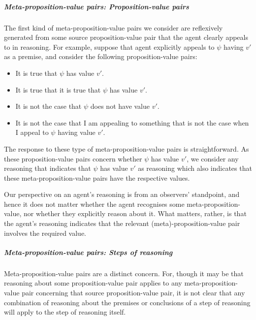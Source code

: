 \subparagraph*{Meta-proposition-value pairs: Proposition-value pairs}

\begin{note}
  The first kind of meta-proposition-value pairs we consider are reflexively generated from some source proposition-value pair that the agent clearly appeals to in reasoning.
  For example, suppose that agent explicitly appeals to \(\psi\) having \(v'\) as a premise, and consider the following proposition-value pairs:
  \begin{itemize}
    \item It is true that \(\psi\) has value \(v'\).
    \item It is true that it is true that \(\psi\) has value \(v'\).
    \item It is not the case that \(\psi\) does not have value \(v'\).
    \item It is not the case that I am appealing to something that is not the case when I appeal to \(\psi\) having value \(v'\).
    \end{itemize}
\end{note}

\begin{note}
  The response to these type of meta-proposition-value pairs is straightforward.
  As these proposition-value pairs concern whether \(\psi\) has value \(v'\), we consider any reasoning that indicates that \(\psi\) has value \(v'\) as reasoning which also indicates that these meta-proposition-value pairs have the respective values.

  Our perspective on an agent's reasoning is from an observers' standpoint, and hence it does not matter whether the agent recognises some meta-proposition-value, nor whether they explicitly reason about it.
  What matters, rather, is that the agent's reasoning indicates that the relevant (meta)-proposition-value pair involves the required value.
\end{note}

\subparagraph*{Meta-proposition-value pairs: Steps of reasoning}

\begin{note}
  Meta-proposition-value pairs are a distinct concern.
  For, though it may be that reasoning about some proposition-value pair applies to any meta-proposition-value pair concerning that source proposition-value pair, it is not clear that any combination of reasoning about the premises or conclusions of a step of reasoning will apply to the step of reasoning itself.
\end{note}


